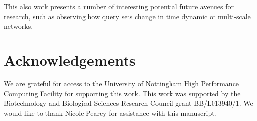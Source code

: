 \documentclass[sigconf]{acmart}
\begin{document}
This also work presents a number of interesting potential future avenues for research, such as observing how query sets change in time dynamic or multi-scale networks.

\section*{Acknowledgements}
We are grateful for access to the University of Nottingham High Performance Computing Facility for supporting this work.
This work was supported by the Biotechnology and Biological Sciences Research Council grant BB/L013940/1.
We would like to thank Nicole Pearcy for assistance with this manuscript.

 


\end{document}
